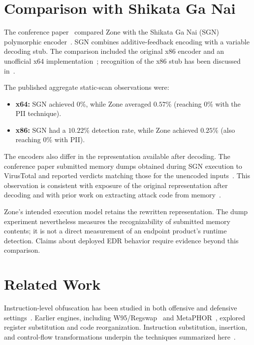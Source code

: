 \documentclass[runningheads]{llncs}
\begin{document}
\section{Comparison with Shikata Ga Nai}\label{sec:comparison}

The conference paper~\cite{zone_secrypt_2026} compared Zone with the Shikata Ga Nai (SGN) polymorphic encoder~\cite{sgnarticle}. SGN combines additive-feedback encoding with a variable decoding stub. The comparison included the original x86 encoder and an unofficial x64 implementation~\cite{sgn64}; recognition of the x86 stub has been discussed in~\cite{sgnstrong}.

The published aggregate static-scan observations were:

\begin{itemize}
    \item \textbf{x64:} SGN achieved $0$\%, while Zone averaged $0.57$\% (reaching $0$\% with the PII technique).
    \item \textbf{x86:} SGN had a $10.22$\% detection rate, while Zone achieved $0.25$\% (also reaching $0$\% with PII).
\end{itemize}

The encoders also differ in the representation available after decoding. The conference paper submitted memory dumps obtained during SGN execution to VirusTotal and reported verdicts matching those for the unencoded inputs~\cite{zone_secrypt_2026}. This observation is consistent with exposure of the original representation after decoding and with prior work on extracting attack code from memory~\cite{codeExtraction}.

Zone's intended execution model retains the rewritten representation. The dump experiment nevertheless measures the recognizability of submitted memory contents; it is not a direct measurement of an endpoint product's runtime detection. Claims about deployed EDR behavior require evidence beyond this comparison.








\section{Related Work}\label{sect:related_work}
Instruction-level obfuscation has been studied in both offensive and defensive settings~\cite{survey1,survey2}. Earlier engines, including W95/Regswap~\cite{desai2010highly} and MetaPHOR~\cite{MetaPHOR}, explored register substitution and code reorganization. Instruction substitution, insertion, and control-flow transformations underpin the techniques summarized here~\cite{desai2008towards,desai2010highly,szor2001hunting,bin2binobf,llvmobf}.
\end{document}
